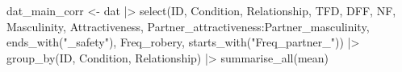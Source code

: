 \documentclass[
  bookmarksnumbered]{article}
\newenvironment{Shaded}{\begin{snugshade}}{\end{snugshade}}
\newcommand{\FunctionTok}[1]{\textcolor[rgb]{0.94,0.94,0.56}{#1}}
\newcommand{\NormalTok}[1]{\textcolor[rgb]{0.80,0.80,0.80}{#1}}
\newcommand{\OtherTok}[1]{\textcolor[rgb]{0.94,0.94,0.56}{#1}}
\newcommand{\SpecialCharTok}[1]{\textcolor[rgb]{0.86,0.64,0.64}{#1}}
\newcommand{\StringTok}[1]{\textcolor[rgb]{0.80,0.58,0.58}{#1}}
\begin{document}
\begin{Shaded}
\begin{Highlighting}[]
\NormalTok{dat\_main\_corr }\OtherTok{\textless{}{-}}\NormalTok{ dat }\SpecialCharTok{|\textgreater{}} 
  \FunctionTok{select}\NormalTok{(ID, Condition, Relationship,}
\NormalTok{         TFD, DFF, NF,}
\NormalTok{         Masculinity, Attractiveness,}
\NormalTok{         Partner\_attractiveness}\SpecialCharTok{:}\NormalTok{Partner\_masculinity,}
         \FunctionTok{ends\_with}\NormalTok{(}\StringTok{"\_safety"}\NormalTok{), Freq\_robery,}
         \FunctionTok{starts\_with}\NormalTok{(}\StringTok{"Freq\_partner\_"}\NormalTok{)) }\SpecialCharTok{|\textgreater{}} 
  \FunctionTok{group\_by}\NormalTok{(ID, Condition, Relationship) }\SpecialCharTok{|\textgreater{}} 
  \FunctionTok{summarise\_all}\NormalTok{(mean)}


\end{Highlighting}
\end{Shaded}
\end{document}
